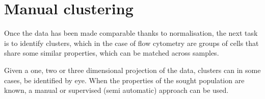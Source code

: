 
%

\section{Manual clustering}

Once the data has been made comparable thanks to normalisation, the next task is to identify clusters, which in the case of flow cytometry are groups of cells that share
some similar properties, which can be matched across samples.  

Given a one, two or three dimensional projection of the data, clusters can in some cases, be identified by eye.
When the properties of the sought population are known, a manual or supervised (semi automatic) approach can be used.

